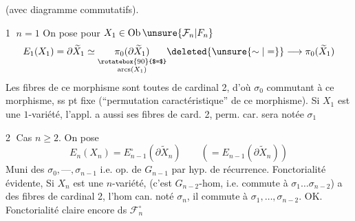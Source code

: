 (avec diagramme commutatifs).

\textcircled{1} $n=1$ \qquad On pose pour $X_1\in\mathrm{Ob}\,\unsure{\mathcal F_n|F_n}$
\[ E_1(X_1)=\partial\widetilde X_1\simeq\underset{\substack{\rotatebox{90}{$=$}\\\mathrm{arcs}(X_1)}}{\pi_0(\partial\widetilde X_1)}\deleted{\unsure{\sim|=}}\longrightarrow\pi_0(\widetilde X_1) \]
Les fibres de ce morphisme sont toutes de cardinal 2, d'où   $\sigma_0$ commutant à ce morphisme, ss pt fixe (``permutation caractéristique'' de ce morphisme). Si $X_1$ est une $1$-variété, l'appl.
a aussi ses fibres de card. 2,  perm. car. sera notée $\sigma_1$

\textcircled{2} Cas $n\geq2$. On pose
\[ E_n(X_n)=E_{n-1}^\circ(\partial\widetilde X_n)\qquad(=E_{n-1}(\partial\widetilde X_n)) \]
Muni des $\sigma_0,\text{---},\sigma_{n-1}$ i.e. op. de $G_{n-1}$ par hyp. de récurrence. Fonctorialité évidente, 
Si $X_n$ est une $n$-variété,  
(c'est  $G_{n-2}$-hom, i.e. commute à $\sigma_1\ldots\sigma_{n-2}$) a des fibres de cardinal 2, l'hom can.  noté $\sigma_n$, il commute à $\sigma_1,\ldots,\sigma_{n-2}$. OK.
Fonctorialité claire encore ds $\mathcal F_n^\circ$
